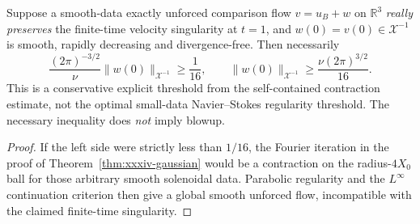 \begin{corollary}
\label{cor:xxxiv-any-blowup-critical}
Suppose a smooth-data exactly unforced comparison flow
$v=u_B+w$ on $\mathbb R^3$ \emph{really preserves}
the finite-time velocity singularity at $t=1$,
and $w(0)=v(0)\in\mathcal X^{-1}$ is smooth,
rapidly decreasing and divergence-free.
Then necessarily
\begin{equation}\label{eq:xxxiv-nonlinearity-threshold}
\boxed{\quad
\frac{(2\pi)^{-3/2}}{\nu}
\|w(0)\|_{\mathcal X^{-1}}\ge\frac1{16},
\qquad
\|w(0)\|_{\mathcal X^{-1}}
\ge\frac{\nu(2\pi)^{3/2}}{16}.\quad}
\end{equation}
This is a conservative explicit threshold from the
self-contained contraction estimate, not the optimal
small-data Navier--Stokes regularity threshold.
The necessary inequality does \emph{not} imply blowup.
\end{corollary}
\begin{proof}
If the left side were strictly less than $1/16$,
the Fourier iteration in the proof of
Theorem~\ref{thm:xxxiv-gaussian} would be a contraction
on the radius-$4X_0$ ball for those arbitrary smooth
solenoidal data. Parabolic regularity and the $L^\infty$
continuation criterion then give a global smooth
unforced flow, incompatible with the claimed
finite-time singularity.
\end{proof}
